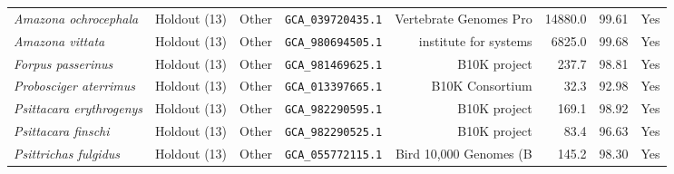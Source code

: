 \documentclass[9pt,a4paper]{article}
\begin{document}
\begin{longtable}{llllrrrr}
\textit{Amazona ochrocephala} & Holdout (13) & Other & \texttt{GCA\_039720435.1} & Vertebrate Genomes Pro & 14880.0 & 99.61 & Yes \\
\textit{Amazona vittata} & Holdout (13) & Other & \texttt{GCA\_980694505.1} & institute for systems  & 6825.0 & 99.68 & Yes \\
\textit{Forpus passerinus} & Holdout (13) & Other & \texttt{GCA\_981469625.1} & B10K project & 237.7 & 98.81 & Yes \\
\textit{Probosciger aterrimus} & Holdout (13) & Other & \texttt{GCA\_013397665.1} & B10K Consortium & 32.3 & 92.98 & Yes \\
\textit{Psittacara erythrogenys} & Holdout (13) & Other & \texttt{GCA\_982290595.1} & B10K project & 169.1 & 98.92 & Yes \\
\textit{Psittacara finschi} & Holdout (13) & Other & \texttt{GCA\_982290525.1} & B10K project & 83.4 & 96.63 & Yes \\
\textit{Psittrichas fulgidus} & Holdout (13) & Other & \texttt{GCA\_055772115.1} & Bird 10,000 Genomes (B & 145.2 & 98.30 & Yes \\
\bottomrule\end{longtable}\clearpage
\end{document}
